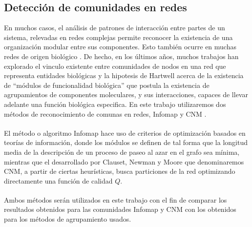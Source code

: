 \subsection{Detección de comunidades en redes}
\label{sec:comunidades}
En muchos casos, el análisis de patrones de interacción entre partes de un sistema, relevadas en redes complejas permite reconocer la existencia de una organización modular entre sus componentes. Esto también ocurre en muchas redes de origen biológico \cite{Barabasi2004}. De hecho, en los últimos años, muchos trabajos han explorado el vinculo existente entre comunidades de nodos en una red que representa entidades biológicas y la hipotesis de Hartwell acerca de la existencia de ``módulos de funcionalidad biológica'' \cite{Hartwell1999} que postula la existencia de agrupamientos de componentes moleculares, y sus interacciones, capaces de llevar adelante una función biológica especifica. En este trabajo utilizaremos dos métodos de reconocimiento de comunas en redes, Infomap \cite{Rosvall2008} y CNM \cite{Clauset2004}.\\\\
El método o algoritmo Infomap hace uso de criterios de optimización basados en teorías de información, donde los módulos se definen de tal forma que la longitud media de la descripción de un proceso de paseo al azar en el grafo sea mínima, mientras que el desarrollado por Clauset, Newman y Moore que denominaremos CNM, a partir de ciertas heurísticas, busca particiones de la red optimizando directamente una función de calidad $Q$.\\\\
Ambos métodos serán utilizados en este trabajo con el fin de comparar los resultados obtenidos para las comunidades Infomap y CNM con los obtenidos para los métodos de agrupamiento usados.\cite{Berenstein2014, Rosvall2008}\\\\

